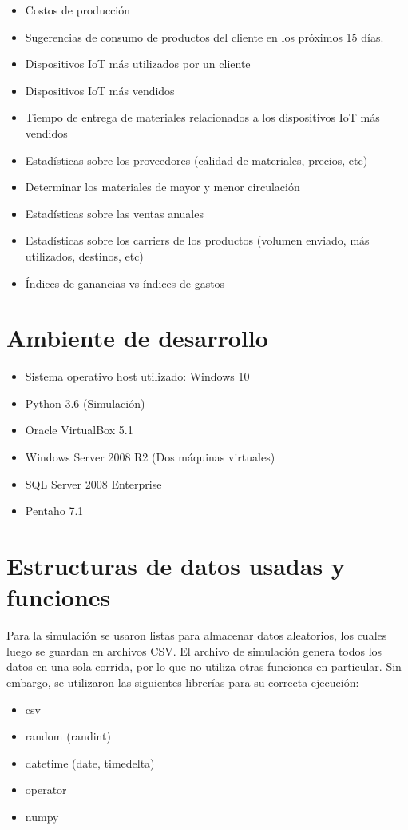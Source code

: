 \documentclass{article}
\begin{document}
\begin{itemize}
  \item Costos de producci\'on
  \item Sugerencias de consumo de productos del cliente en los pr\'oximos 15 d\'ias.
  \item Dispositivos IoT m\'as utilizados por un cliente
  \item Dispositivos IoT m\'as vendidos
  \item Tiempo de entrega de materiales relacionados a los dispositivos IoT m\'as vendidos
  \item Estad\'isticas sobre los proveedores (calidad de materiales, precios, etc)
  \item Determinar los materiales de mayor y menor circulaci\'on
  \item Estad\'isticas sobre las ventas anuales
  \item Estad\'isticas sobre los carriers de los productos (volumen enviado, m\'as utilizados, destinos, etc)
  \item \'Indices de ganancias vs \'indices de gastos
\end{itemize}

\section{Ambiente de desarrollo}
\begin{itemize}
  \item Sistema operativo host utilizado: Windows 10
  \item Python 3.6 (Simulaci\'on)
  \item Oracle VirtualBox 5.1
  \item Windows Server 2008 R2 (Dos m\'aquinas virtuales)
  \item SQL Server 2008 Enterprise
  \item Pentaho 7.1
\end{itemize}

\section{Estructuras de datos usadas y funciones}
Para la simulaci\'on se usaron listas para almacenar datos aleatorios, los cuales luego se guardan en archivos CSV. El archivo de simulaci\'on genera todos los datos en una sola corrida, por lo que no utiliza otras funciones en particular. Sin embargo, se utilizaron las siguientes librer\'ias para su correcta ejecuci\'on:
\begin{itemize}
  \item csv
  \item random (randint)
  \item datetime (date, timedelta)
  \item operator
  \item numpy
\end{itemize}
\end{document}
